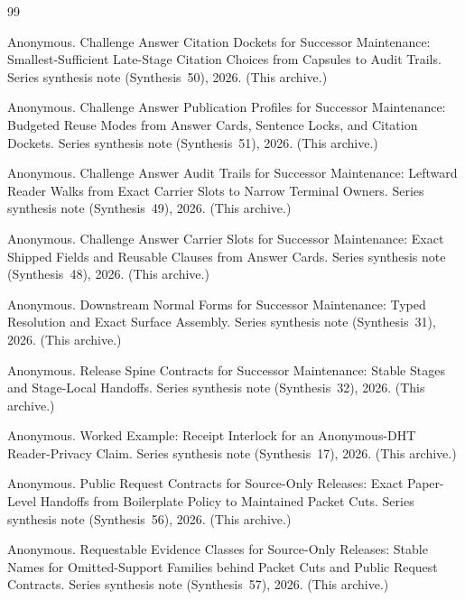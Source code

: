 \documentclass[11pt]{article}
\begin{document}
\begin{thebibliography}{99}\small

Anonymous.
\newblock Challenge Answer Citation Dockets for Successor Maintenance: Smallest-Sufficient Late-Stage Citation Choices from Capsules to Audit Trails.
\newblock Series synthesis note (Synthesis~50), 2026. (This archive.)

Anonymous.
\newblock Challenge Answer Publication Profiles for Successor Maintenance: Budgeted Reuse Modes from Answer Cards, Sentence Locks, and Citation Dockets.
\newblock Series synthesis note (Synthesis~51), 2026. (This archive.)

Anonymous.
\newblock Challenge Answer Audit Trails for Successor Maintenance: Leftward Reader Walks from Exact Carrier Slots to Narrow Terminal Owners.
\newblock Series synthesis note (Synthesis~49), 2026. (This archive.)

Anonymous.
\newblock Challenge Answer Carrier Slots for Successor Maintenance: Exact Shipped Fields and Reusable Clauses from Answer Cards.
\newblock Series synthesis note (Synthesis~48), 2026. (This archive.)

Anonymous.
\newblock Downstream Normal Forms for Successor Maintenance: Typed Resolution and Exact Surface Assembly.
\newblock Series synthesis note (Synthesis~31), 2026. (This archive.)

Anonymous.
\newblock Release Spine Contracts for Successor Maintenance: Stable Stages and Stage-Local Handoffs.
\newblock Series synthesis note (Synthesis~32), 2026. (This archive.)

Anonymous.
\newblock Worked Example: Receipt Interlock for an Anonymous-DHT Reader-Privacy Claim.
\newblock Series synthesis note (Synthesis~17), 2026. (This archive.)

Anonymous.
\newblock Public Request Contracts for Source-Only Releases: Exact Paper-Level Handoffs from Boilerplate Policy to Maintained Packet Cuts.
\newblock Series synthesis note (Synthesis~56), 2026. (This archive.)

Anonymous.
\newblock Requestable Evidence Classes for Source-Only Releases: Stable Names for Omitted-Support Families behind Packet Cuts and Public Request Contracts.
\newblock Series synthesis note (Synthesis~57), 2026. (This archive.)


\end{thebibliography}
\end{document}

